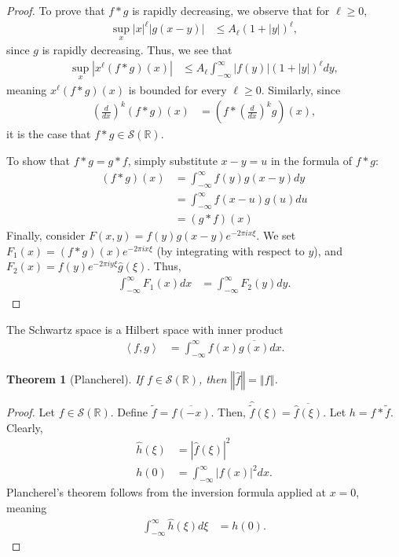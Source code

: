 \documentclass[10pt]{extarticle}
\newcommand{\R}{\mathbb{R}}
\newcommand{\iprod}[2]{\left\langle #1,#2\right\rangle}
\newcommand{\norm}[1]{\left\Vert #1\right\Vert}
\theoremstyle{plain}
\newtheorem*{theorem}{Theorem}%
\theoremstyle{definition}
\theoremstyle{remark}
\renewcommand{\newline}{\hfill\break}
\begin{document}
  \begin{proof}
  To prove that $f\ast g$ is rapidly decreasing, we observe that for $\ell \geq 0$,
  \begin{align*}
    \sup_{x}|x|^{\ell}|g(x-y)| &\leq A_{\ell}(1+|y|)^{\ell},
  \end{align*}
  since $g$ is rapidly decreasing. Thus, we see that
  \begin{align*}
    \sup_{x}\left\vert x^{\ell}(f\ast g)(x) \right\vert &\leq A_{\ell}\int_{-\infty}^{\infty}|f(y)|\left(1 + |y|\right)^{\ell}dy,
  \end{align*}
  meaning $x^{\ell}(f\ast g)(x)$ is bounded for every $\ell \geq 0$. Similarly, since
  \begin{align*}
    \left(\frac{d}{dx}\right)^k \left(f\ast g\right)(x) &= \left(f\ast \left(\frac{d}{dx}\right)^{k}g\right)(x),
  \end{align*}
  it is the case that $f\ast g \in \mathcal{S}(\R)$. \newline

  To show that $f\ast g = g\ast f$, simply substitute $x - y = u$ in the formula of $f\ast g$:
  \begin{align*}
    \left(f\ast g\right)(x) &= \int_{-\infty}^{\infty}f(y)g(x-y)dy\\
               &= \int_{-\infty}^{\infty}f(x-u)g(u)du\\
               &= \left(g\ast f\right)(x)
  \end{align*}
  Finally, consider $F(x,y) = f(y)g(x-y)e^{-2\pi i x \xi}$. We set $F_1(x) = (f\ast g)(x)e^{-2\pi i x \xi}$ (by integrating with respect to $y$), and $F_2(x) = f(y)e^{-2\pi i y \xi}\hat{g}(\xi)$. Thus,
  \begin{align*}
    \int_{-\infty}^{\infty}F_1(x)dx &= \int_{-\infty}^{\infty}F_2(y)dy.
  \end{align*}
  \end{proof}
  The Schwartz space is a Hilbert space with inner product
  \begin{align*}
    \iprod{f}{g} &= \int_{-\infty}^{\infty}f(x)\overline{g(x)} dx.
  \end{align*}
  \begin{theorem}[Plancherel]
    If $f\in \mathcal{S}(\R)$, then $\norm{\hat{f}} = \norm{f}$.
  \end{theorem}
  \begin{proof}
    Let $f\in \mathcal{S}(\R)$. Define $\tilde{f} = \overline{f(-x)}$. Then, $\widehat{\tilde{f}}(\xi) = \overline{\hat{f}(\xi)}$. Let $h = f\ast \tilde{f}$. Clearly,
    \begin{align*}
      \hat{h}(\xi) &= \left\vert \hat{f}(\xi) \right\vert^2\\
      h(0) &= \int_{-\infty}^{\infty}|f(x)|^2dx.
    \end{align*}
    Plancherel's theorem follows from the inversion formula applied at $x=0$, meaning
    \begin{align*}
      \int_{-\infty}^{\infty}\hat{h}(\xi)d\xi &= h(0).
    \end{align*}
  \end{proof}
\end{document}
